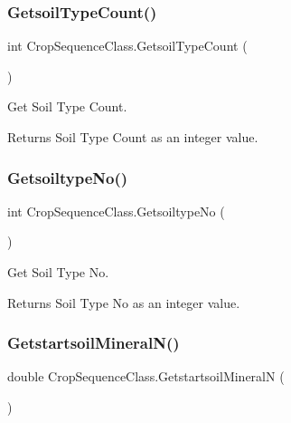 \subsubsection{\texorpdfstring{GetsoilTypeCount()}{GetsoilTypeCount()}}
{\footnotesize\ttfamily int Crop\+Sequence\+Class.\+Getsoil\+Type\+Count (\begin{DoxyParamCaption}{ }\end{DoxyParamCaption})\hspace{0.3cm}{\ttfamily [inline]}}



Get Soil Type Count. 

\begin{DoxyReturn}{Returns}
Soil Type Count as an integer value. 
\end{DoxyReturn}
\mbox{\label{class_crop_sequence_class_a67028b47c354bfb43f638d6d031a23e7}} 
\subsubsection{\texorpdfstring{GetsoiltypeNo()}{GetsoiltypeNo()}}
{\footnotesize\ttfamily int Crop\+Sequence\+Class.\+Getsoiltype\+No (\begin{DoxyParamCaption}{ }\end{DoxyParamCaption})\hspace{0.3cm}{\ttfamily [inline]}}



Get Soil Type No. 

\begin{DoxyReturn}{Returns}
Soil Type No as an integer value. 
\end{DoxyReturn}
\mbox{\label{class_crop_sequence_class_aa75e7190f9466903705719d46718786b}} 
\subsubsection{\texorpdfstring{GetstartsoilMineralN()}{GetstartsoilMineralN()}}
{\footnotesize\ttfamily double Crop\+Sequence\+Class.\+Getstartsoil\+MineralN (\begin{DoxyParamCaption}{ }\end{DoxyParamCaption})\hspace{0.3cm}{\ttfamily [inline]}}



